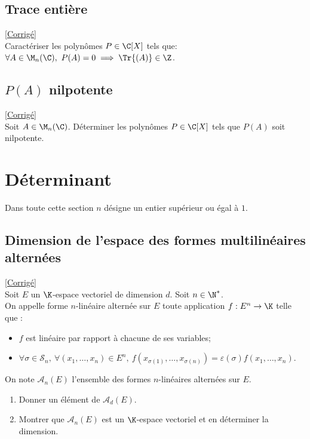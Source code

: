 \documentclass[8pt]{book}
\begin{document}
	\section{Trace entière }
	\label{Trace entière}
	\textcolor{blue}{\hyperref[Trace entière corrigé]{[Corrigé]}}\\
	Caractériser les polynômes $P\in \C[X]$ tels que: $\forall A\in \M_n(\C),\ P(A)=0\implies \Tr{(A)}\in\Z$.
	
	\section{$P(A)$ nilpotente }
	\textcolor{blue}{\hyperref[P(A) nilpotente corrigé]{[Corrigé]}}\\
	\label{P(A) nilpotente}
	Soit $A\in \M_n(\C)$. Déterminer les polynômes $P\in \C[X]$ tels que $P(A)$ soit nilpotente.
	
\chapter{Déterminant}
	Dans toute cette section $n$ désigne un entier supérieur ou égal à $1$.\\
	
	\section{Dimension de l'espace des formes multilinéaires alternées }
	\label{Dimension de l'espace des formes multilinéaires alternées}
	\textcolor{blue}{\hyperref[Dimension de l'espace des formes multilinéaires alternées corrigé]{[Corrigé]}}\\
	Soit $E$ un $\K$-espace vectoriel de dimension $d$. Soit $n\in \N^*$.\\
	On appelle forme $n$-linéaire alternée sur $E$ toute application $f:E^n\to\K$ telle que :
	\begin{itemize}
		\item $f$ est linéaire par rapport à chacune de ses variables;
		\item $\forall \sigma\in \mathcal S_n,\ \forall (x_1,\dots,x_n)\in E^n,\ f(x_{\sigma(1)},\dots,x_{\sigma(n)})=\varepsilon(\sigma)f(x_1,\dots,x_n)$.
	\end{itemize}
	On note $\mathcal A_n(E)$ l'ensemble des formes $n$-linéaires alternées sur $E$.
	\begin{enumerate}
		\item Donner un élément de $\mathcal A_d(E)$.
		\item Montrer que $\mathcal A_n(E)$ est un $\K$-espace vectoriel et en déterminer la dimension.
	\end{enumerate}
	
\end{document}
